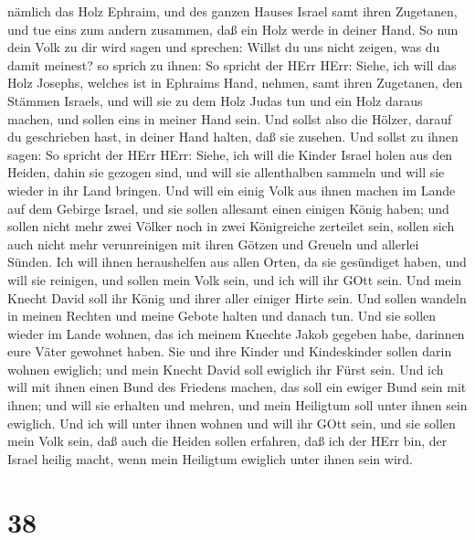 nämlich das Holz Ephraim, und des ganzen Hauses Israel samt ihren
Zugetanen,  und tue eins zum andern zusammen, daß ein Holz
werde in deiner Hand.  So nun dein Volk zu dir wird sagen
und sprechen: Willst du uns nicht zeigen, was du damit meinest?
 so sprich zu ihnen: So spricht der HErr HErr: Siehe, ich
will das Holz Josephs, welches ist in Ephraims Hand, nehmen, samt ihren
Zugetanen, den Stämmen Israels, und will sie zu dem Holz Judas tun und
ein Holz daraus machen, und sollen eins in meiner Hand sein.
 Und sollst also die Hölzer, darauf du geschrieben hast, in
deiner Hand halten, daß sie zusehen.  Und sollst zu ihnen
sagen: So spricht der HErr HErr: Siehe, ich will die Kinder Israel holen
aus den Heiden, dahin sie gezogen sind, und will sie allenthalben
sammeln und will sie wieder in ihr Land bringen.  Und will
ein einig Volk aus ihnen machen im Lande auf dem Gebirge Israel, und sie
sollen allesamt einen einigen König haben; und sollen nicht mehr zwei
Völker noch in zwei Königreiche zerteilet sein,  sollen
sich auch nicht mehr verunreinigen mit ihren Götzen und Greueln und
allerlei Sünden. Ich will ihnen heraushelfen aus allen Orten, da sie
gesündiget haben, und will sie reinigen, und sollen mein Volk sein, und
ich will ihr GOtt sein.  Und mein Knecht David soll ihr
König und ihrer aller einiger Hirte sein. Und sollen wandeln in meinen
Rechten und meine Gebote halten und danach tun.  Und sie
sollen wieder im Lande wohnen, das ich meinem Knechte Jakob gegeben
habe, darinnen eure Väter gewohnet haben. Sie und ihre Kinder und
Kindeskinder sollen darin wohnen ewiglich; und mein Knecht David soll
ewiglich ihr Fürst sein.  Und ich will mit ihnen einen Bund
des Friedens machen, das soll ein ewiger Bund sein mit ihnen; und will
sie erhalten und mehren, und mein Heiligtum soll unter ihnen sein
ewiglich.  Und ich will unter ihnen wohnen und will ihr
GOtt sein, und sie sollen mein Volk sein,  daß auch die
Heiden sollen erfahren, daß ich der HErr bin, der Israel heilig macht,
wenn mein Heiligtum ewiglich unter ihnen sein wird.

\hypertarget{section-37}{%
\section{38}\label{section-37}}


